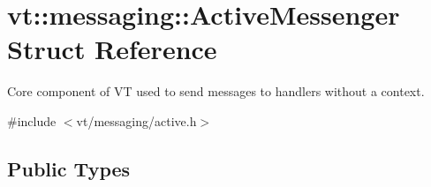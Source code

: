 \hypertarget{structvt_1_1messaging_1_1_active_messenger}{}\section{vt\+:\+:messaging\+:\+:Active\+Messenger Struct Reference}
\label{structvt_1_1messaging_1_1_active_messenger}


Core component of VT used to send messages to handlers without a context.  




{\ttfamily \#include $<$vt/messaging/active.\+h$>$}

\subsection*{Public Types}

